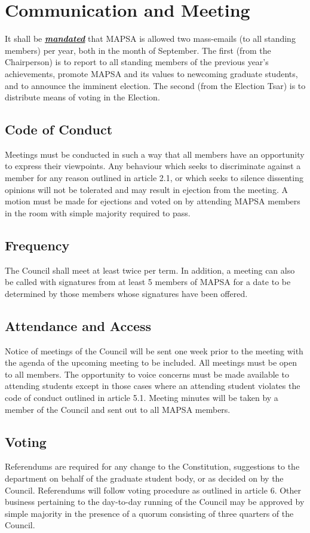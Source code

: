 \documentclass[8pt]{article}
\begin{document}
	
	\section{Communication and Meeting}
	It shall be \textbf{\textit{\underline{mandated}}} that MAPSA is allowed two mass-emails (to all standing members) per year, both in the month of September. The first (from the Chairperson) is to report to all standing members of the previous year's achievements, promote MAPSA and its values to newcoming graduate students, and to announce the imminent election. The second (from the Election Tsar) is to distribute means of voting in the Election.
	\subsection{Code of Conduct}
	Meetings must be conducted in such a way that all members have an opportunity to express their viewpoints. Any behaviour which seeks to discriminate against a member for any reason outlined in article 2.1, or which seeks to silence dissenting opinions will not be tolerated and may result in ejection from the meeting. A motion must be made for ejections and voted on by attending MAPSA members in the room with simple majority required to pass.
	
	\subsection{Frequency}
	The Council shall meet at least twice per term. In addition, a meeting can also be called with signatures from at least 5 members of MAPSA for a date to be determined by those members whose signatures have been offered.
	
	\subsection{Attendance and Access}
	Notice of meetings of the Council will be sent one week prior to the meeting with the agenda of the upcoming meeting to be included. All meetings must be open to all members. The opportunity to voice concerns must be made available to attending students except in those cases where an attending student violates the code of conduct outlined in article 5.1. Meeting minutes will be taken by a member of the Council and sent out to all MAPSA members.
	
	\subsection{Voting}
	Referendums are required for any change to the Constitution, suggestions to the department on behalf of the graduate student body, or as decided on by the Council. Referendums will follow voting procedure as outlined in article 6. Other business pertaining to the day-to-day running of the Council may be approved by simple majority in the presence of a quorum consisting of three quarters of the Council.
	
\end{document}
